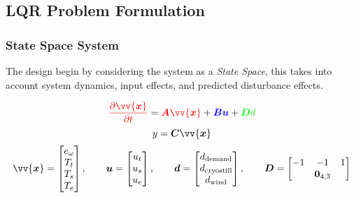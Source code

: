 \subsection{LQR Problem Formulation}

\subsubsection{State Space System}
\label{sec:lqr}

The design begin by considering the system as a \emph{State Space}, this takes into account {\color{red}system dynamics}, {\color{blue}input effects}, and predicted {\color{green}disturbance effects}.

    \begin{equation}
            {\color{red} \frac{ \partial \vv{\bm{x}} }{ \partial t } }  = {\color{red} \bm{A} \vv{\bm{x}}} + {\color{blue}\bm{B}{\bm{u}} }+ {\color{green}\bm{D} d}
    \end{equation}
        \begin{equation}
            y = \bm{C} \vv{\bm{x}}
        \end{equation}
        \begin{equation}
                \vv{\bm{x}} =
                \begin{bmatrix}
                        e_{\omega}\\
                        T_{t}\\
                        T_{s}\\
                        T_{e}\\
                \end{bmatrix}
                ,
                \qquad
                \bm{u} =
                \begin{bmatrix}
                        u_t\\
                        u_s\\
                        u_e\\
                \end{bmatrix}
                ,
                \qquad
                \bm{d} =
                \begin{bmatrix}
                        d_{\text{demand}}\\
                        d_{\text{cryostill}}\\
                        d_{\text{wind}}
                \end{bmatrix}
                ,
                \qquad
                \bm{D} =
                \begin{bmatrix}
                        -1 & -1 & 1 \\
                        \, & \bm{0}_{4,3} & \, \\
                \end{bmatrix}
        \end{equation}
